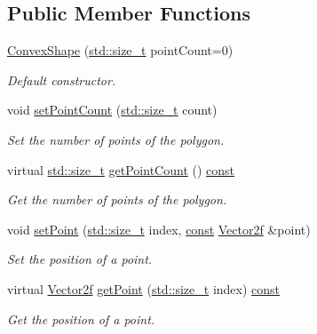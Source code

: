 \subsection*{Public Member Functions}
\begin{DoxyCompactItemize}
\item 
\hyperlink{classsf_1_1_convex_shape_af9981b8909569b381b3fccf32fc69856}{Convex\-Shape} (\hyperlink{nc__alloc_8h_a7b60c5629e55e8ec87a4547dd4abced4}{std\-::size\-\_\-t} point\-Count=0)
\begin{DoxyCompactList}\small\item\em Default constructor. \end{DoxyCompactList}\item 
void \hyperlink{classsf_1_1_convex_shape_a56e6e79ade6dd651cc1a0e39cb68deae}{set\-Point\-Count} (\hyperlink{nc__alloc_8h_a7b60c5629e55e8ec87a4547dd4abced4}{std\-::size\-\_\-t} count)
\begin{DoxyCompactList}\small\item\em Set the number of points of the polygon. \end{DoxyCompactList}\item 
virtual \hyperlink{nc__alloc_8h_a7b60c5629e55e8ec87a4547dd4abced4}{std\-::size\-\_\-t} \hyperlink{classsf_1_1_convex_shape_a8c420c1fc0f51706a15509ab53278f4a}{get\-Point\-Count} () \hyperlink{term__entry_8h_a57bd63ce7f9a353488880e3de6692d5a}{const} 
\begin{DoxyCompactList}\small\item\em Get the number of points of the polygon. \end{DoxyCompactList}\item 
void \hyperlink{classsf_1_1_convex_shape_a5929e0ab0ba5ca1f102b40c234a8e92d}{set\-Point} (\hyperlink{nc__alloc_8h_a7b60c5629e55e8ec87a4547dd4abced4}{std\-::size\-\_\-t} index, \hyperlink{term__entry_8h_a57bd63ce7f9a353488880e3de6692d5a}{const} \hyperlink{namespacesf_a80cea3c46537294fd1d8d428566ad8b2}{Vector2f} \&point)
\begin{DoxyCompactList}\small\item\em Set the position of a point. \end{DoxyCompactList}\item 
virtual \hyperlink{namespacesf_a80cea3c46537294fd1d8d428566ad8b2}{Vector2f} \hyperlink{classsf_1_1_convex_shape_acc954374da2ca7fe58a0cccbf6d1e6e5}{get\-Point} (\hyperlink{nc__alloc_8h_a7b60c5629e55e8ec87a4547dd4abced4}{std\-::size\-\_\-t} index) \hyperlink{term__entry_8h_a57bd63ce7f9a353488880e3de6692d5a}{const} 
\begin{DoxyCompactList}\small\item\em Get the position of a point. \end{DoxyCompactList}\item 

\end{DoxyCompactItemize}
